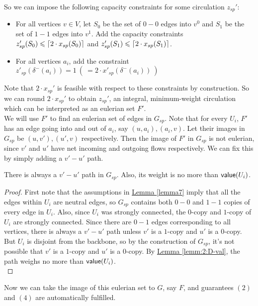 \documentclass[./main.tex]{subfiles}
\DeclarePairedDelimiter\ceil{\lceil}{\rceil}
\begin{document}
		So we can impose the following capacity constraints for some circulation $z_{sp}'$:
		\begin{itemize}[-]
			\item For all vertices $v\in V$, let $S_0$ be the set of $0-0$ edges into $v^0$ and $S_1$ be the set of $1-1$ edges into $v^1$.
					Add the capacity constraints $z'_{sp}(S_0)\leqslant \ceil{2\cdot x_{sp}(S_0)}$ and $z'_{sp}(S_1)\leqslant \ceil{2\cdot x_{sp}(S_1)}$.

			\item For all vertices $a_i$, add the constraint $z'_{sp}(\delta^-(a_i)) = 1\  (\ = 2\cdot x'_{sp}(\delta^-(a_i))\ )$
		\end{itemize}
		Note that $2\cdot x_{sp}'$ is feasible with respect to these constraints by construction.
		So we can round $2\cdot x_{sp}'$ to obtain $z_{sp}'$, an integral, minimum-weight circulation which can be interpreted as an eulerian set $F'$.
		\vspace{2mm}\\
		We will use $F'$ to find an eulerian set of edges in $G_{sp}$. Note that for every $U_i$, $F'$ has an edge going into and out of $a_i$, say $(u,a_i),(a_i,v)$. Let their images in $G_{sp}$ be $(u,v'),(u',v)$ respectively. Then the image of $F'$ in $G_{sp}$ is not eulerian, since $v'$ and $u'$ have net incoming and outgoing flows respectively. We can fix this by simply adding a $v'-u'$ path.\\\vspace{2mm}

		\begin{claim}
			There is always a $v'-u'$ path in $G_{sp}$. Also, its weight is no more than $\textsf{\textup{value}}(U_i)$.\label{claim:7:uvpath}
		\end{claim}
		\begin{proof}
			First note that the assumptions in \hyperref[lemma7]{Lemma \ref{lemma7}} imply that all the edges within $U_i$ are neutral edges, so $G_{sp}$ contains both $0-0$ and $1-1$ copies of every edge in $U_i$. Also, since $U_i$ was strongly connected, the $0$-copy and $1$-copy of $U_i$ are strongly connected. Since there are $0-1$ edges corresponding to all vertices, there is always a $v'-u'$ path unless $v'$ is a $1$-copy and $u'$ is a $0$-copy. But $U_i$ is disjoint from the backbone, so by the construction of $G_{sp}$, it's not possible that $v'$ is a $1$-copy and $u'$ is a $0$-copy. By \hyperref[lemm:2:D-val]{Lemma \ref{lemm:2:D-val}}, the path weighs no more than $\textsf{\textup{value}}(U_i)$.\\
		\end{proof}
Now we can take the image of this eulerian set to $G$, say $F$, and guarantees $(2)$ and $(4)$ are automatically fulfilled.\vspace{2mm}
\end{document}
